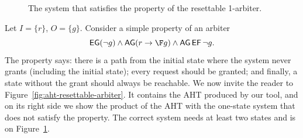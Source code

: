 \begin{figure}[hbp]
\centering
\caption{The system that satisfies the property of the resettable 1-arbiter.}
\label{fig:aht-resettable-arbiter:model}
\end{figure}

Let $I = \{r\}$, $O=\{g\}$.
Consider a simple \CTLstar property of an arbiter
$$
\EG(\neg g ) \land \AG(r \impl \F g) \land \AG\EF \neg g.
$$
The property says:
there is a path from the initial state where the system never grants
(including the initial state);
every request should be granted;
and finally, a state without the grant should always be reachable.
We now invite the reader to Figure~\ref{fig:aht-resettable-arbiter}.
It contains the AHT produced by our tool,
and on its right side we show the product of the AHT
with the one-state system that does not satisfy the property.
The correct system needs at least two states and is on Figure~\ref{fig:aht-resettable-arbiter:model}.


